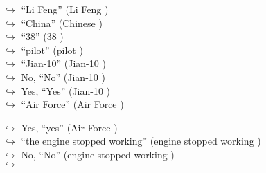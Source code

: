 \documentclass[11pt,a4paper, onecolumn]{article}
\begin{document}
\begin{figure}[t] \small \begin{tcolorbox}[boxsep=0pt,left=5pt,right=0pt,top=2pt,colback = yellow!5] \begin{dialogue}
 \small 
\colorbox{pink!25}{$\hookrightarrow$}
{ ``Li Feng'' (Li Feng ) }
\\
\colorbox{pink!25}{$\hookrightarrow$}
{ ``China'' (Chinese ) }
\\
\colorbox{pink!25}{$\hookrightarrow$}
{ ``38'' (38 ) }
\\
\colorbox{pink!25}{$\hookrightarrow$}
{ ``pilot'' (pilot ) }
\\
\colorbox{pink!25}{$\hookrightarrow$}
{ ``Jian-10'' (Jian-10 ) }
\\
\colorbox{pink!25}{$\hookrightarrow$}
\colorbox{red!25}{No,}
{ ``No'' (Jian-10 ) }
\\
\colorbox{pink!25}{$\hookrightarrow$}
\colorbox{red!25}{Yes,}
{ ``Yes'' (Jian-10 ) }
\\
\colorbox{pink!25}{$\hookrightarrow$}
{ ``Air Force'' (Air Force ) }
 \end{dialogue}\end{tcolorbox}\end{figure}\begin{figure}[t] \small \begin{tcolorbox}[boxsep=0pt,left=5pt,right=0pt,top=2pt,colback = yellow!5] \begin{dialogue}
 \small 
\colorbox{pink!25}{$\hookrightarrow$}
\colorbox{red!25}{Yes,}
{ ``yes'' (Air Force ) }
\\
\colorbox{pink!25}{$\hookrightarrow$}
{ ``the engine stopped working'' (engine stopped working ) }
\\
\colorbox{pink!25}{$\hookrightarrow$}
\colorbox{red!25}{No,}
{ ``No'' (engine stopped working ) }
\\
\colorbox{pink!25}{$\hookrightarrow$}

\end{dialogue}
\end{tcolorbox}
\end{figure}
\end{document}
